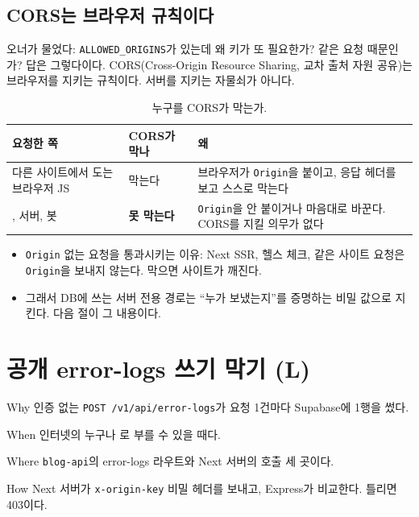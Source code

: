 \subsection{CORS는 브라우저 규칙이다}\label{sec:05-cors-limit}

오너가 물었다: \texttt{ALLOWED\_ORIGINS}가 있는데 왜 키가 또 필요한가?
 같은 요청 때문인가?
답은 그렇다이다.
CORS(Cross-Origin Resource Sharing, 교차 출처 자원 공유)는 브라우저를 지키는 규칙이다.
서버를 지키는 자물쇠가 아니다.

\begin{table}[H]
  \caption{누구를 CORS가 막는가.}\label{tab:05-cors-who}
  \small
  \begin{tabularx}{\linewidth}{L{5cm} L{2.6cm} Y}
    \toprule
    요청한 쪽 & CORS가 막나 & 왜 \\
    \midrule
    다른 사이트에서 도는 브라우저 JS & 막는다 & 브라우저가 \texttt{Origin}을 붙이고, 응답 헤더를 보고 스스로 막는다 \\
    \midrule
    , 서버, 봇 & \textbf{못 막는다} & \texttt{Origin}을 안 붙이거나 마음대로 바꾼다. CORS를 지킬 의무가 없다 \\
    \bottomrule
  \end{tabularx}
\end{table}

\begin{itemize}[nosep]
  \item \texttt{Origin} 없는 요청을 통과시키는 이유: Next SSR, 헬스 체크, 같은 사이트 요청은 \texttt{Origin}을 보내지 않는다. 막으면 사이트가 깨진다.
  \item 그래서 DB에 쓰는 서버 전용 경로는 ``누가 보냈는지''를 증명하는 비밀 값으로 지킨다. 다음 절이 그 내용이다.
\end{itemize}

\section{공개 error-logs 쓰기 막기 (L)}\label{sec:05-errorlogs}

\begin{inbrief}
  \item[Why] 인증 없는 \texttt{POST /v1/api/error-logs}가 요청 1건마다 Supabase에 1행을 썼다.
  \item[When] 인터넷의 누구나 로 부를 수 있을 때다.
  \item[Where] \texttt{blog-api}의 error-logs 라우트와 Next 서버의 호출 세 곳이다.
  \item[How] Next 서버가 \texttt{x-origin-key} 비밀 헤더를 보내고, Express가 비교한다. 틀리면 403이다.
\end{inbrief}


